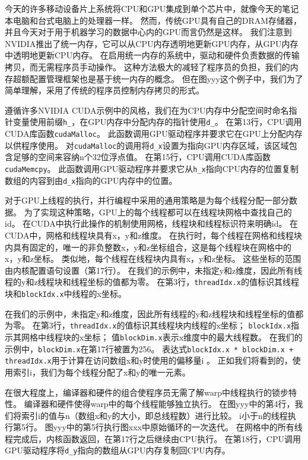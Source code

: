 今天的许多移动设备片上系统将CPU和GPU集成到单个芯片中，就像今天的笔记本电脑和台式电脑上的处理器一样。 
然而，传统GPU具有自己的DRAM存储器，并且今天对于用于机器学习的数据中心内的GPU而言仍然是这样。 
我们注意到NVIDIA推出了统一内存，它可以从CPU内存透明地更新GPU内存，从GPU内存中透明地更新CPU内存。 
在启用统一内存的系统中，驱动和硬件负责数据的传输拷贝，而无需程序员手动操作。
这种方法极大的减轻了程序员的负担，我们的内存超额配置管理框架也是基于统一内存的概念。
但在图yyy这个例子中，我们为了简单理解，采用了传统的程序员控制内存拷贝的形式。

遵循许多NVIDIA CUDA示例中的风格，我们在为CPU内存中分配空间时命名指针变量使用前缀\texttt{h_}，在GPU内存中分配内存的指针使用\texttt{d_}。 
在第13行，CPU调用CUDA库函数\texttt{cudaMalloc}。 
此函数调用GPU驱动程序并要求它在GPU上分配内存以供程序使用。 
对\texttt{cudaMalloc}的调用将\texttt{d_x}设置为指向GPU内存区域，该区域包含足够的空间来容纳n个32位浮点值。 
在第15行，CPU调用CUDA库函数\texttt{cudaMemcpy}。 
此函数调用GPU驱动程序并要求它从\texttt{h_x}指向CPU内存的位置复制数组的内容到由\texttt{d_x}指向的GPU内存中的位置。

对于GPU上线程的执行，并行编程中采用的通用策略是为每个线程分配一部分数据。
为了实现这种策略，GPU上的每个线程都可以在线程块网格中查找自己的id。
在CUDA中执行此操作的机制使用网格，线程块和线程标识符来明确id。
在CUDA中，网格和线程块具有x，y和z维度。
在执行时，每个线程在网格和线程块内具有固定的，唯一的非负整数x，y和z坐标组合，这是每个线程块在网格中的x，y和z坐标。
类似地，每个线程在线程块内具有x，y和z坐标。
这些坐标的范围由内核配置语句设置（第17行）。
在我们的示例中，未指定y和z维度，因此所有线程的y和z线程块和线程坐标的值都为零。
在第3行，\texttt{threadIdx.x}的值标识其线程块和\texttt{blockIdx.x}中线程的x坐标。

在我们的示例中，未指定y和z维度，因此所有线程的y和z线程块和线程坐标的值都为零。
在第3行，\texttt{threadIdx.x}的值标识其线程块内线程的x坐标；
\texttt{blockIdx.x}指示其网格中线程块的x坐标；
值\texttt{blockDim.x}表示x维度中的最大线程数。
在我们的示例中，\texttt{blockDim.x}在第17行被置为256。
表达式\texttt{blockIdx.x * blockDim.x + threadIdx.x}用于计算在访问数组x和y时使用的偏移量i 。
正如我们将看到的，使用索引i，我们为每个线程分配了x和y的唯一元素。

在很大程度上，编译器和硬件的组合使程序员无需了解warp中线程执行的锁步特性。 
编译器和硬件使得warp中的每个线程能够独立执行。 
在图yyy中的第4行，我们将索引i的值与n（数组x和y的大小，即总线程数）进行比较。 
i小于n的线程执行第5行。
图yyy中的第5行执行图xxx中原始循环的一次迭代。 
在网格中的所有线程完成后，内核函数返回，在第17行之后继续由CPU执行。
在第18行，CPU调用GPU驱动程序将\texttt{d_y}指向的数组从GPU内存复制回CPU内存。

